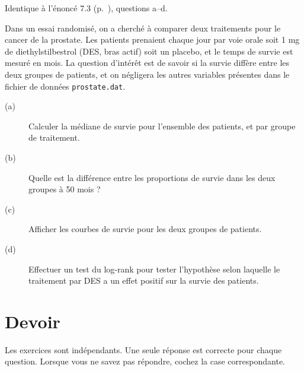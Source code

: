 \begin{exo}\label{exo:11.2}
{\footnotesize Identique à l'énoncé 7.3 (p.~\pageref{exo:7.3}), questions
  a–d}.

Dans un essai randomisé, on a cherché à comparer deux traitements pour le
cancer de la prostate. Les patients prenaient chaque jour par voie orale
soit 1 mg de diethylstilbestrol (DES, bras actif) soit un placebo, et le
temps de survie est mesuré en mois.\autocite{collett94} La question
d'intérêt est de savoir si la survie diffère entre les deux groupes de
patients, et on négligera les autres variables présentes dans le fichier de
données \texttt{prostate.dat}. 
\begin{description}
\item[(a)] Calculer la médiane de survie pour l'ensemble des patients, et
  par groupe de traitement.
\item[(b)] Quelle est la différence entre les proportions de survie dans les
  deux groupes à 50 mois ?
\item[(c)] Afficher les courbes de survie pour les deux groupes de patients.
\item[(d)] Effectuer un test du log-rank pour tester l'hypothèse selon
  laquelle le traitement par DES a un effet positif sur la survie des
  patients. 
\end{description}
\end{exo}

\chapter*{Devoir }

Les exercices sont indépendants. Une seule réponse est correcte pour chaque
question. Lorsque vous ne savez pas répondre, cochez la case correspondante.

